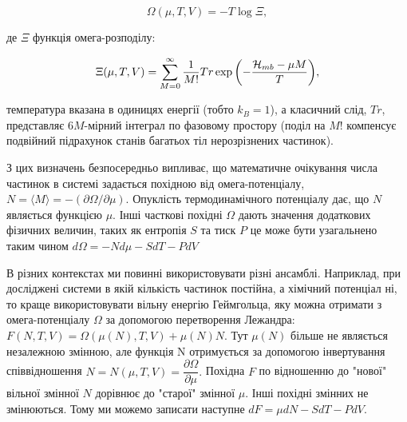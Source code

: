 \begin{equation}
\label{eqn:omegapotential}
	\Omega(\mu,T,V) = -T\log\Xi,
\end{equation}
 
де $\Xi$ функція омега-розподілу:

\begin{equation}
\label{eqn:sgranddistr}
	\Xi(\mu, T, V) = \sum\limits_{M = 0}^\infty\frac{1}{M!}Tr\exp{\left(-\frac{{\cal H}_{mb} - {\mu} M}{T}\right)},
\end{equation}

температура вказана в одиницях енергії (тобто $k_{B} = 1$), а класичний слід, $Tr$, представляє $6M$-мірний інтеграл по фазовому простору (поділ на $M!$ компенсує подвійний підрахунок станів багатьох тіл нерозрізнених частинок). 

З цих визначень безпосередньо випливає, що математичне очікування числа частинок в системі задається похідною від омега-потенціалу, $N = \langle M \rangle = -(\partial{\Omega}/\partial{\mu})$. Опуклість термодинамічного потенціалу \cite{convexfreeenerg} дає, що $N$ являється функцією $\mu$. Інші часткові похідні $\Omega$ дають значення додаткових фізичних величин, таких як ентропія $S$ та тиск $P$ це може бути узагальнено таким чином $d\Omega = -Nd\mu - SdT - PdV$

В різних контекстах ми повинні використовувати різні ансамблі. Наприклад, при досліджені системи в якій кількість частинок постійна, а хімічний потенціал ні, то краще використовувати вільну енергію Геймгольца, яку можна отримати з омега-потенціалу $\Omega$ за допомогою перетворення Лежандра: $F(N,T,V) = \Omega(\mu(N),T,V)+\mu(N)N.$
Тут $\mu(N)$ більше не являється незалежною змінною, але функція N отримується за допомогою інвертування співвідношення $N = N({\mu},T,V)=\dfrac{\partial\Omega}{\partial\mu}.$ Похідна $F$ по відношенню до "нової" вільної змінної $N$ дорівнює до "старої" змінної $\mu$. Інші похідні змінних не змінюються. Тому ми можемо записати наступне $dF={\mu}dN - SdT - PdV$.

